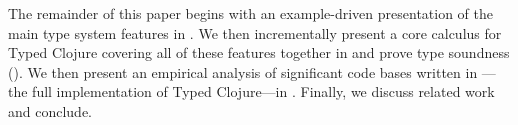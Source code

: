 
\noindent
 The remainder of this paper begins with an example-driven
 presentation of the main type system features in
 . We then incrementally present a core calculus
 for Typed Clojure covering all of these features together in
  and prove type soundness
 (). We then 
 present an empirical analysis of significant code bases written
 in \coretyped{}---the full implementation of Typed Clojure---in . 
 Finally, we discuss related work and conclude.

